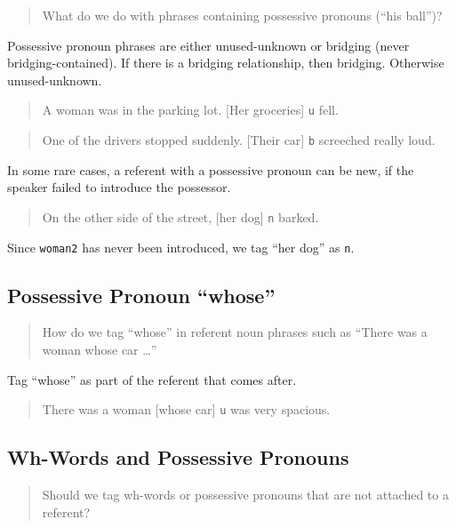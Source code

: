 \documentclass[
]{book}
\begin{document}
\begin{quote}
What do we do with phrases containing possessive pronouns (``his ball'')?
\end{quote}

Possessive pronoun phrases are either unused-unknown or bridging (never bridging-contained).
If there is a bridging relationship, then bridging. Otherwise unused-unknown.

\begin{quote}
A woman was in the parking lot.
{[}Her groceries{]} \texttt{u} fell.
\end{quote}

\begin{quote}
One of the drivers stopped suddenly.
{[}Their car{]} \texttt{b} screeched really loud.
\end{quote}

In some rare cases, a referent with a possessive pronoun can be new,
if the speaker failed to introduce the possessor.

\begin{quote}
On the other side of the street, {[}her dog{]} \texttt{n} barked.
\end{quote}

Since \texttt{woman2} has never been introduced, we tag ``her dog'' as \texttt{n}.

\hypertarget{possessive-pronoun-whose}{%
\subsection{Possessive Pronoun ``whose''}\label{possessive-pronoun-whose}}

\begin{quote}
How do we tag ``whose'' in referent noun phrases such as ``There was a woman whose car \ldots{}''
\end{quote}

Tag ``whose'' as part of the referent that comes after.

\begin{quote}
There was a woman {[}whose car{]} \texttt{u} was very spacious.
\end{quote}

\hypertarget{wh-words-and-possessive-pronouns}{%
\subsection{Wh-Words and Possessive Pronouns}\label{wh-words-and-possessive-pronouns}}

\begin{quote}
Should we tag wh-words or possessive pronouns that are not attached to a referent?
\end{quote}
\end{document}
